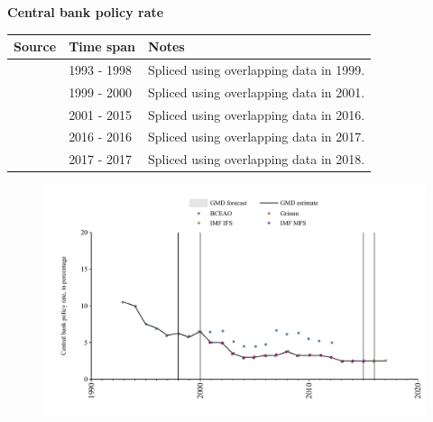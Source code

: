 \documentclass[12pt,a4paper,landscape]{article}
\begin{document}
\begin{adjustbox}{max totalsize={\paperwidth}{\paperheight},center}
\begin{minipage}[t][\textheight][t]{\textwidth}
\vspace*{0.5cm}
{}
\begin{center}
{\Large\bfseries Central bank policy rate}
\end{center}
\vspace{0.5cm}
\begin{table}[H]
\centering
\small
\begin{tabular}{|l|l|l|}
\hline
\textbf{Source} & \textbf{Time span} & \textbf{Notes} \\
\hline
\rowcolor{white}\cite{BCEAO}& 1993 - 1998 &Spliced using overlapping data in 1999. \\
\rowcolor{lightgray}\cite{Grimm}& 1999 - 2000 &Spliced using overlapping data in 2001. \\
\rowcolor{white}\cite{IMF_MFS}& 2001 - 2015 &Spliced using overlapping data in 2016. \\
\rowcolor{lightgray}\cite{Grimm}& 2016 - 2016 &Spliced using overlapping data in 2017. \\
\rowcolor{white}\cite{IMF_IFS}& 2017 - 2017 &Spliced using overlapping data in 2018. \\
\hline
\end{tabular}
\end{table}
\begin{figure}[H]
\centering
\includegraphics[width=\textwidth,height=0.6\textheight,keepaspectratio]{graphs/SEN_cbrate.pdf}
\end{figure}
\end{minipage}
\end{adjustbox}
\end{document}
